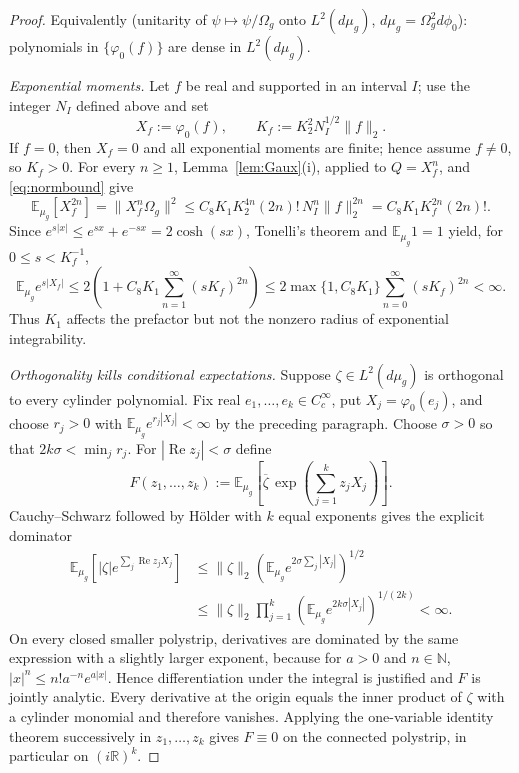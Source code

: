 \documentclass[11pt,a4paper]{article}
\theoremstyle{plain}
\theoremstyle{definition}
\newcommand{\R}{\mathbb{R}}
\newcommand{\E}{\mathbb{E}}
\newcommand{\Om}{\Omega}
\begin{document}
\begin{proof}
Equivalently (unitarity of $\psi\mapsto\psi/\Om_g$ onto $L^2(d\mu_g)$, $d\mu_g=\Om_g^2d\phi_0$):
polynomials in $\{\varphi_0(f)\}$ are dense in $L^2(d\mu_g)$.

\emph{Exponential moments.} Let $f$ be real and supported in an interval $I$; use the integer
$N_I$ defined above and set
\[
 X_f:=\varphi_0(f),\qquad K_f:=K_2^2N_I^{1/2}\|f\|_2.
\]
If $f=0$, then $X_f=0$ and all exponential moments are finite; hence assume $f\ne0$, so
$K_f>0$.
For every $n\ge1$, Lemma~\ref{lem:Gaux}(i), applied to $Q=X_f^n$, and
\eqref{eq:normbound} give
\[
 \E_{\mu_g}[X_f^{2n}]
 =\|X_f^n\Om_g\|^2
 \le C_8K_1K_2^{4n}(2n)!\,N_I^n\|f\|_2^{2n}
 =C_8K_1K_f^{2n}(2n)!.
\]
Since $e^{s|x|}\le e^{sx}+e^{-sx}=2\cosh(sx)$, Tonelli's theorem and
$\E_{\mu_g}1=1$ yield, for $0\le s<K_f^{-1}$,
\[
 \E_{\mu_g}e^{s|X_f|}
 \le2\left(1+C_8K_1\sum_{n=1}^{\infty}(sK_f)^{2n}\right)
 \le2\max\{1,C_8K_1\}\sum_{n=0}^{\infty}(sK_f)^{2n}<\infty.
\]
Thus $K_1$ affects the prefactor but not the nonzero radius of exponential integrability.

\emph{Orthogonality kills conditional expectations.} Suppose
$\zeta\in L^2(d\mu_g)$ is orthogonal to every cylinder polynomial. Fix real
$e_1,\dots,e_k\in C_c^\infty$, put $X_j=\varphi_0(e_j)$, and choose $r_j>0$ with
$\E_{\mu_g}e^{r_j|X_j|}<\infty$ by the preceding paragraph. Choose $\sigma>0$ so that
$2k\sigma<\min_j r_j$. For $|\operatorname{Re}z_j|<\sigma$ define
\[
 F(z_1,\dots,z_k)
 :=\E_{\mu_g}\!\left[\overline\zeta\,
       \exp\!\left(\sum_{j=1}^kz_jX_j\right)\right].
\]
Cauchy--Schwarz followed by H\"older with $k$ equal exponents gives the explicit dominator
\begin{align*}
 \E_{\mu_g}\!\left[|\zeta|e^{\sum_j\operatorname{Re}z_jX_j}\right]
 &\le\|\zeta\|_2
       \left(\E_{\mu_g}e^{2\sigma\sum_j|X_j|}\right)^{1/2}\\
 &\le\|\zeta\|_2
       \prod_{j=1}^k\left(\E_{\mu_g}e^{2k\sigma|X_j|}\right)^{1/(2k)}
 <\infty.
\end{align*}
On every closed smaller polystrip, derivatives are dominated by the same expression with a
slightly larger exponent, because for $a>0$ and $n\in\mathbb N$,
$|x|^n\le n!a^{-n}e^{a|x|}$. Hence differentiation under the integral is justified and $F$ is
jointly analytic. Every derivative at the origin equals the inner product of $\zeta$ with a
cylinder monomial and therefore vanishes. Applying the one-variable identity theorem
successively in $z_1,\ldots,z_k$ gives $F\equiv0$ on the connected polystrip, in particular
on $(i\R)^k$.


\end{proof}
\end{document}

